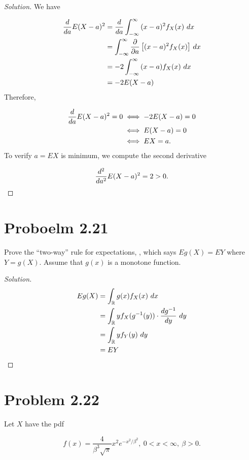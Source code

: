 \documentclass[12pt,letterpaper,reqno]{amsart}
\numberwithin{equation}{subsection}
\begin{document}
\begin{proof}[Solution]
We have

\begin{align*}
    \Dif{}{a} E(X-a)^2 &= \Dif{}{a} \myint{(x-a)^2 f_X(x)}{x}{-\infty}{\infty} \\
    &= \myint{\dif{}{a} \left[ (x-a)^2 f_X(x) \right]}{x}{-\infty}{\infty} \\
    &=-2 \myint{(x-a)f_X(x)}{x}{-\infty}{\infty} \\
    &= -2 E(X-a)
\end{align*}
Therefore,

\begin{align*}
    \Dif{}{a} E(X-a)^2 = 0 &\iff -2E(X-a) = 0 \\
                           &\iff E(X-a) = 0 \\
                           &\iff EX = a.
\end{align*}
To verify $a = EX$ is minimum, we compute the second derivative

\[ \Dif{^2}{a^2} E(X-a)^2 = 2 > 0.\]
\end{proof}

\newpage
\section{Proboelm 2.21}

Prove the ``two-way'' rule for expectations, \cite[Equation (2.2.5) on page 58]{Berger-Casella}, which says $Eg(X) = EY$ where $Y = g(X)$. Assume that $g(x)$ is a monotone function.

\begin{proof}[Solution]
\begin{align*}
    Eg(X) &= \myint{g(x) f_X(x)}{x}{\D{R}}{} \\
          &= \myint{y f_X(g^{-1}(y)) \cdot \Dif{g^{-1}}{y}}{y}{\D{R}}{} \\
          &= \myint{y f_Y(y)}{y}{\D{R}}{} \\
          &= EY
\end{align*}
\end{proof}

\newpage
\section{Problem 2.22}

Let $X$ have the pdf

\[ f(x) = \frac{4}{\beta^3 \sqrt{\pi}} x^2 e^{-x^2/ \beta^2}, \ 0<x<\infty, \ \beta > 0. \]
\end{document}
